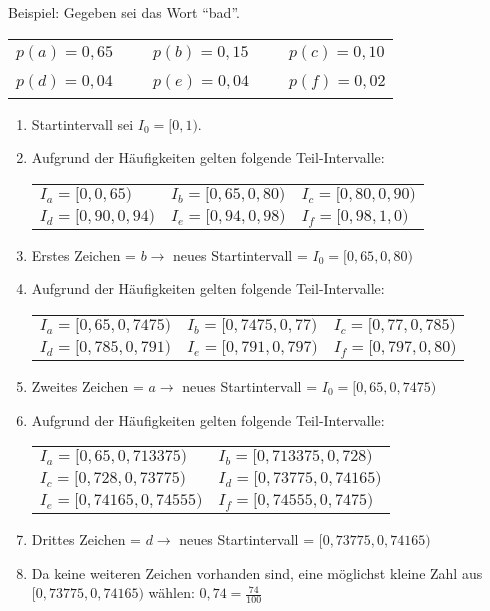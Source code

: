 Beispiel: Gegeben sei das Wort \enquote{bad}.\\
\begin{tabular}{lclcl}
	$p(a) = 0{,}65$ & ~ & 
	$p(b) = 0{,}15$ & ~ &
	$p(c) = 0{,}10$ \\
	$p(d) = 0{,}04$ & ~ & 
	$p(e) = 0{,}04$ & ~ &
	$p(f) = 0{,}02$ 
\end{tabular}
\begin{enumerate}
	\item Startintervall sei $I_0 = [0, 1)$.
	\item Aufgrund der Häufigkeiten gelten folgende Teil-Intervalle:\\
		\begin{tabular}{lll}
			$I_a = [0, 0{,}65)$  & $I_b = [0{,}65, 0{,}80)$  & $I_c = [0{,}80, 0{,}90)$ \\
			$I_d = [0{,}90, 0{,}94)$  & $I_e = [0{,}94, 0{,}98)$  & $I_f = [0{,}98, 1{,}0)$ \\			
		\end{tabular}
	\item Erstes Zeichen = $b \rightarrow $ neues Startintervall = $I_0 = [0{,}65, 0{,}80)$
	\item Aufgrund der Häufigkeiten gelten folgende Teil-Intervalle:\\
		\begin{tabular}{lll}
			$I_a = [0{,}65, 0{,}7475)$  & $I_b = [0{,}7475, 0{,}77)$  & $I_c = [0{,}77, 0{,}785)$ \\
			$I_d = [0{,}785, 0{,}791)$  & $I_e = [0{,}791, 0{,}797)$  & $I_f = [0{,}797, 0{,}80)$ \\			
		\end{tabular}
	\item Zweites Zeichen = $a \rightarrow$ neues Startintervall = $I_0 = [0{,}65, 0{,}7475)$
	\item Aufgrund der Häufigkeiten gelten folgende Teil-Intervalle:\\
		\begin{tabular}{ll}
			$I_a = [0{,}65, 0{,}713375)$  & $I_b = [0{,}713375, 0{,}728)$\\  
			$I_c = [0{,}728, 0{,}73775)$  & $I_d = [0{,}73775, 0{,}74165)$\\
			$I_e = [0{,}74165, 0{,}74555)$  & $I_f = [0{,}74555, 0{,}7475)$ \\			
		\end{tabular}
	\item Drittes Zeichen = $d \rightarrow $ neues Startintervall = $[0{,}73775, 0{,}74165)$
	\item Da keine weiteren Zeichen vorhanden sind, eine möglichst kleine Zahl aus $[0{,}73775, 0{,}74165)$ wählen: $0{,}74 = \frac{74}{100}$
\end{enumerate}

